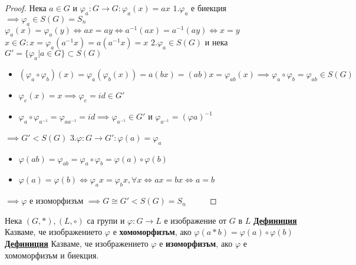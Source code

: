 \documentclass{article}
\begin{document}
\begin{proof}
Нека $a \in G$ и $\varphi_a : G \rightarrow G : \varphi_a(x) = ax$ \newline\newline
$1. \varphi_a$ е биекция $\implies \varphi_a \in S(G) = S_n$ \newline $\varphi_a(x) = \varphi_a(y) \iff ax = ay \iff a^{-1}(ax) = a^{-1}(ay) \iff x = y$
$x \in G : x = \varphi_a(a^{-1}x) = a(a^{-1}x) = x$ \newline\newline
$2. \varphi_a \in S(G)$ и нека $G' = \{\varphi_a | a \in G\} \subset S(G)$
\begin{itemize}
    \item $(\varphi_a \circ \varphi_b)(x) = \varphi_a(\varphi_b(x)) = a(bx) = (ab)x = \varphi_{ab}(x) \implies
    \varphi_a \circ \varphi_b = \varphi_{ab} \in S(G)$
    \item $\varphi_e(x) = x \implies \varphi_e = id \in G'$
    \item $\varphi_a \circ \varphi_{a^{-1}} = \varphi_{aa^{-1}} = id \implies \varphi_{a^{-1}} \in G'$ и
    $\varphi_{a^{-1}} = (\varphi a)^{-1}$
\end{itemize}
$\implies G' < S(G)$ \newline\newline
$3. \varphi : G \rightarrow G' : \varphi(a) = \varphi_a$
\begin{itemize}
    \item $\varphi(ab) = \varphi_{ab} = \varphi_a \circ \varphi_b = \varphi(a) \circ \varphi(b)$
    \item $\varphi(a) = \varphi(b) \iff \varphi_ax = \varphi_bx, \forall x \iff ax = bx \iff a = b$
\end{itemize}
$\implies \varphi$ е изоморфизъм $\implies G \cong G' < S(G) = S_n \hspace{1cm}$
\end{proof}
Нека $(G, *), (L, \circ)$ са групи и $\varphi : G \rightarrow L$ е изображение от $G$ в $L$ \newline\newline
\textbf{\underline{Дефиниция}}
Казваме, че изображението $\varphi$ е \textbf{хомоморфизъм}, ако \newline $\varphi(a * b) = \varphi(a) \circ \varphi(b)$ \newline\newline
\textbf{\underline{Дефиниция}}
Казваме, че изображението $\varphi$ е \textbf{изоморфизъм}, ако \newline $\varphi$ е хомоморфизъм и биекция. \newline\newline
\end{document}
